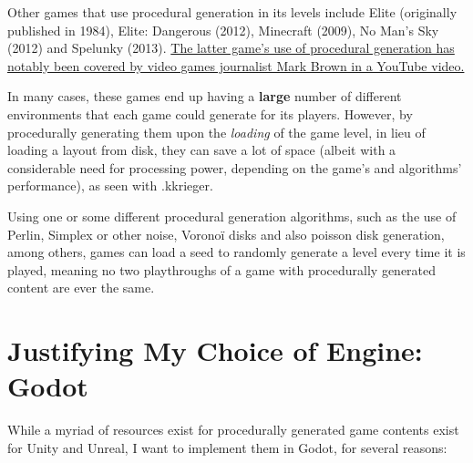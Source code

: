 
Other games that use procedural generation in its levels include Elite (originally published in 1984), Elite: Dangerous (2012), Minecraft (2009), No Man's Sky (2012) and Spelunky (2013). \href{https://youtu.be/Uqk5Zf0tw3o}{The latter game's use of procedural generation has notably been covered by video games journalist Mark Brown in a YouTube video.}


In many cases, these games end up having a \textbf{large} number of different environments that each game could generate for its players. However, by procedurally generating them upon the \textit{loading} of the game level, in lieu of loading a layout from disk, they can save a lot of space (albeit with a considerable need for processing power, depending on the game's and algorithms' performance), as seen with .kkrieger.%

Using one or some different procedural generation algorithms, such as the use of Perlin, Simplex or other noise, Voronoï disks and also poisson disk generation, among others, games can load a seed to randomly generate a level every time it is played, meaning no two playthroughs of a game with procedurally generated content are ever the same.

\section{Justifying My Choice of Engine: Godot}

While a myriad of resources exist for procedurally generated game contents exist for Unity and Unreal, I want to implement them in Godot, for several reasons:

